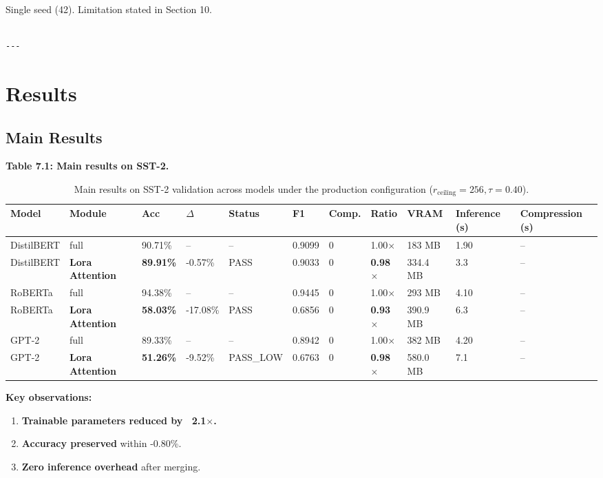Single seed (42). Limitation stated in Section 10.
\begin{lstlisting}

---
\end{lstlisting}

\section{Results}

\subsection{Main Results}

\textbf{Table 7.1: Main results on SST-2.}

\begin{table}[t]
\centering
\small
\begin{tabular}{lllllllllll}
\toprule
\textbf{Model} & \textbf{Module} & \textbf{Acc} & \textbf{$\Delta$} & \textbf{Status} & \textbf{F1} & \textbf{Comp.} & \textbf{Ratio} & \textbf{VRAM} & \textbf{Inference (s)} & \textbf{Compression (s)} \\
\midrule
DistilBERT & full & 90.71\% & -- & -- & 0.9099 & 0 & 1.00$\times$ & 183 MB & 1.90 & -- \\
DistilBERT & \textbf{Lora Attention} & \textbf{89.91\%} & -0.57\% & PASS & 0.9033 & 0 & \textbf{0.98$\times$} & 334.4 MB & 3.3 & -- \\
RoBERTa & full & 94.38\% & -- & -- & 0.9445 & 0 & 1.00$\times$ & 293 MB & 4.10 & -- \\
RoBERTa & \textbf{Lora Attention} & \textbf{58.03\%} & -17.08\% & PASS & 0.6856 & 0 & \textbf{0.93$\times$} & 390.9 MB & 6.3 & -- \\
GPT-2 & full & 89.33\% & -- & -- & 0.8942 & 0 & 1.00$\times$ & 382 MB & 4.20 & -- \\
GPT-2 & \textbf{Lora Attention} & \textbf{51.26\%} & -9.52\% & PASS_LOW & 0.6763 & 0 & \textbf{0.98$\times$} & 580.0 MB & 7.1 & -- \\
\bottomrule
\end{tabular}
\caption{Main results on SST-2 validation across models under the production configuration ($r_{\mathrm{ceiling}}=256, \tau=0.40$).}
\label{tab:main_sst2}
\end{table}

\textbf{Key observations:}

\begin{enumerate}
\item \textbf{Trainable parameters reduced by ~2.1$\times$.}
\item \textbf{Accuracy preserved} within -0.80\%.
\item \textbf{Zero inference overhead} after merging.

\end{enumerate}
